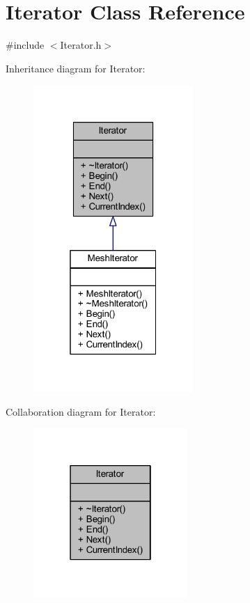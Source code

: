 \hypertarget{class_iterator}{}\section{Iterator Class Reference}
\label{class_iterator}


{\ttfamily \#include $<$Iterator.\+h$>$}



Inheritance diagram for Iterator\+:\nopagebreak
\begin{figure}[H]
\begin{center}
\leavevmode
\includegraphics[width=172pt]{class_iterator__inherit__graph}
\end{center}
\end{figure}


Collaboration diagram for Iterator\+:\nopagebreak
\begin{figure}[H]
\begin{center}
\leavevmode
\includegraphics[width=166pt]{class_iterator__coll__graph}
\end{center}
\end{figure}
